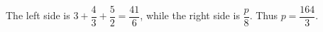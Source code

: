 The left side is $3+\dfrac{4}{3}+\dfrac{5}{2}=\dfrac{41}{6}$, while the right side is $\dfrac{p}{8}$. Thus $\boxed{p=\dfrac{164}{3}}$.
